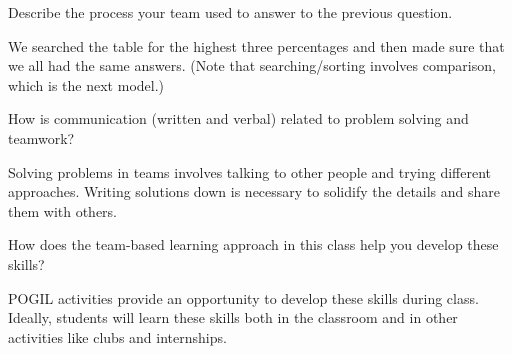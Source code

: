 \vspace{-1ex}


\Q Describe the process your team used to answer to the previous question.

\begin{answer}[3em]
We searched the table for the highest three percentages and then made sure that we all had the same answers.
(Note that searching/sorting involves comparison, which is the next model.)
\end{answer}


\Q How is communication (written and verbal) related to problem solving and teamwork?

\begin{answer}[3em]
Solving problems in teams involves talking to other people and trying different approaches.
Writing solutions down is necessary to solidify the details and share them with others.
\end{answer}


\Q How does the team-based learning approach in this class help you develop these skills?

\begin{answer}[3em]
POGIL activities provide an opportunity to develop these skills during class.
Ideally, students will learn these skills both in the classroom and in other activities like clubs and internships.
\end{answer}
